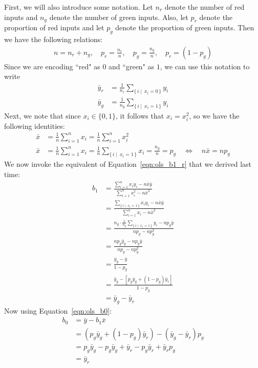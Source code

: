 \documentclass[12pt, a4paper]{article}
\theoremstyle{definition}
\begin{document}
	First, we will also introduce some notation. Let $n_r$ denote the number of red
	inputs and $n_g$ denote the number of green inputs. Also, let $p_r$ denote the proportion
	of red inputs and let $p_g$ denote the proportion of green inputs. Then
	we have the following relations:
	\begin{align*}
		n = n_r + n_g,\quad
		p_r = \frac{n_r}{n},\quad
		p_g = \frac{n_g}{n},\quad
		p_r=(1-p_g)
	\end{align*}
	Since we are encoding ``red" as $0$ and ``green" as $1$, we can use this notation to write
	\begin{align*}
		\bar{y}_r &= \frac{1}{n_r}\sum_{\{\,i \mid \ x_i=0\,\}}y_i\\
		\bar{y}_g &= \frac{1}{n_g}\sum_{\{\,i \mid \ x_i=1\,\} }y_i
	\end{align*}
	Next, we note that since $x_i\in\{0, 1\}$, it follows that $x_i=x_i^2$, so
	we have the following identities:
	\begin{align*}
		\bar{x} &= \frac{1}{n}\sum_{i=1}^{n}x_i=\frac{1}{n}\sum_{i=1}^{n}x_i^2\\
		\bar{x} &= \frac{1}{n}\sum_{i=1}^{n}x_i =\frac{1}{n}\sum_{\{\,i\mid\ x_i = 1\,\}}x_i=
		\frac{n_g}{n}=p_g\quad \iff \quad n\bar{x}=np_g
	\end{align*}
	We now invoke the equivalent of Equation~\ref{eqn:ols_b1_r} that we derived last time:
	\begin{align*}
		b_1 &= \frac{\sum_{i=1}^{n} x_iy_i - n\bar{x}\bar{y}}{\sum_{i=1}^{n}x_i^2-n\bar{x}^2}\\
		&=\frac{\underset{\{\,i \mid\ x_i = 1\,\}}{\sum} x_iy_i - n\bar{x}\bar{y}}{\sum_{i=1}^{n}x_i-n\bar{x}^2}
		\tag{Zeros do not contribute to sum, and $x_i=x_i^2$}\\
		&=\frac{n_g\cdot \frac{1}{n_g}\underset{\{\,i \mid\ x_i = 1\,\}}{\sum} y_i - np_g\bar{y}}{np_g - np_g^2}
		\tag{$x_i=1\implies x_i\cdot y_i=y_i$}\\
		&=\frac{np_g\bar{y}_g - np_g\bar{y}}{np_g - np_g^2}
		\tag{$n_g=np_g$}\\
		&=\frac{\bar{y}_g - \bar{y}}{1-p_g}\\
		&=\frac{\bar{y}_g - [p_g\bar{y}_g + (1-p_g)\bar{y}_r]}{1-p_g}\\
		&=\bar{y}_g-\bar{y}_r
	\end{align*}
	Now using Equation~\ref{eqn:ols_b0}:
	\begin{align*}
		b_0 &= \bar{y} - b_1\bar{x}\\
		&=(p_g\bar{y}_g+(1-p_g)\bar{y}_r)-(\bar{y}_g-\bar{y}_r)p_g\\
		&=p_g\bar{y}_g - p_g\bar{y}_g + \bar{y}_r - p_g\bar{y}_r + \bar{y}_rp_g\\
		&=\bar{y}_r
	\end{align*}
\end{document}
